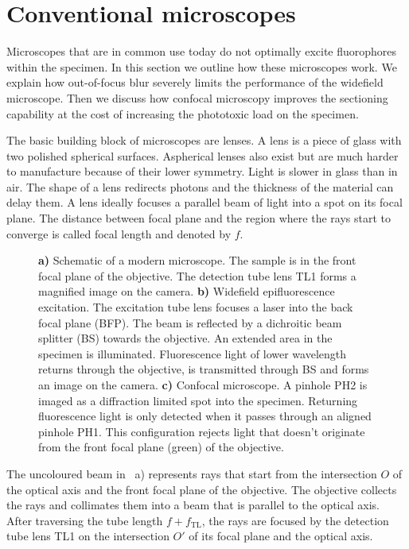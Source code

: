 \section{Conventional microscopes}
\begin{summary}
  Microscopes that are in common use today do not optimally excite
  fluorophores within the specimen. In this section we outline how
  these microscopes work. We explain how out-of-focus blur severely
  limits the performance of the widefield microscope. Then we discuss
  how confocal microscopy improves the sectioning capability at the
  cost of increasing the phototoxic load on the specimen.
\end{summary}
The basic building block of microscopes are lenses. A lens is a piece
of glass with two polished spherical surfaces. Aspherical lenses also
exist but are much harder to manufacture because of their lower
symmetry. Light is slower in glass than in air. The shape of a lens
redirects photons and the thickness of the material can delay them. A
lens ideally focuses a parallel beam of light into a spot on its focal
plane. The distance between focal plane and the region where the rays
start to converge is called focal length and denoted by $f$.
\begin{figure}[!hbt]
  \centering
  
  \caption{{\bf a)} Schematic of a modern microscope. The sample is in
    the front focal plane of the objective. The detection tube lens TL1
    forms a magnified image on the camera. {\bf b)} Widefield
    epifluorescence excitation. The excitation tube lens focuses a
    laser into the back focal plane (BFP). The beam is reflected by a
    dichroitic beam splitter (BS) towards the objective. An extended
    area in the specimen is illuminated. Fluorescence light of lower
    wavelength returns through the objective, is transmitted through
    BS and forms an image on the camera. {\bf c)} Confocal
    microscope. A pinhole PH2 is imaged as a diffraction limited spot
    into the specimen. Returning fluorescence light is only detected
    when it passes through an aligned pinhole PH1. This configuration
    rejects light that doesn't originate from the front focal plane
    (green) of the objective.}
  \label{fig:widefield-microscope}
\end{figure}

The uncoloured beam in ~a) represents
rays that start from the intersection $O$ of the optical axis and the
front focal plane of the objective. The objective collects the rays
and collimates them into a beam that is parallel to the optical
axis. After traversing the tube length $f+f_\textrm{TL}$, the rays are
focused by the detection tube lens TL1 on the intersection $O'$ of its
focal plane and the optical axis. 

